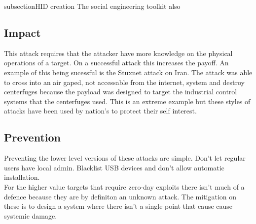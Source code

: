 subsection{HID creation}
The social engineering toolkit also 
\subsection{Impact}
This attack requires that the attacker have more knowledge on the physical operations of a target. On a successful attack this increases the payoff. An example of this being sucessful is the Stuxnet attack on Iran. The attack was able to cross into an air gaped, not accessable from the internet, system and destroy centerfuges because the payload was designed to target the industrial control systems that the centerfuges used. This is an extreme example but these styles of attacks have been used by nation's to protect their self interest.

\subsection{Prevention}
Preventing the lower level versions of these attacks are simple. Don't let regular users have local admin. Blacklist USB devices and don't allow automatic installation.\\
For the higher value targets that require zero-day exploits there isn't much of a defence because they are by definiton an unknown attack. The mitigation on these is to design a system where there isn't a single point that cause cause systemic damage.  
